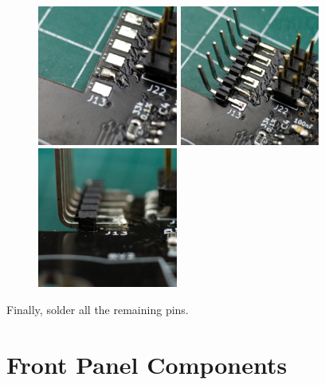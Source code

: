 \documentclass[12pt, a4paper]{article}
\begin{document}
\begin{figure}[H]
    \centering
    \includegraphics[width=46mm]{images/section_2-2_pad_soldered.jpg}
    \hspace{2mm}
    \includegraphics[width=46mm]{images/section_2-2_soldered.jpg}
    \hspace{2mm}
    \includegraphics[width=46mm]{images/section_2-2_flat.jpg}
\end{figure}

Finally, solder all the remaining pins.

\pagebreak
\section{Front Panel Components}
\end{document}
